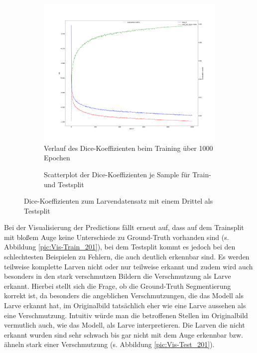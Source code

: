 \begin{figure}[H]
\centering
\begin{minipage}{.6\textwidth}
\begin{subfigure}{\textwidth}
\centering
\includegraphics[width=\textwidth]{Pictures/nnUnet/Praxis/Task201-Larven-drittel-testsplit/progress_201-Larven-drittel-testsplit.png}
\caption{Verlauf des Dice-Koeffizienten beim Training über 1000 Epochen}
\label{pic:Prog_201}
\end{subfigure}
\end{minipage}%
\begin{minipage}{.4\textwidth}
\begin{subfigure}{\textwidth}

\caption{Scatterplot der Dice-Koeffizienten je Sample für Train- und Testsplit}
\label{pic:Dice_201}
\end{subfigure}
\end{minipage}

\caption{Dice-Koeffizienten zum Larvendatensatz mit einem Drittel als Testsplit}
\end{figure}

Bei der Visualisierung der Predictions fällt erneut auf, dass auf dem Trainsplit mit bloßem Auge keine Unterschiede zu Ground-Truth vorhanden sind (s. Abbildung \ref{pic:Vis-Train_201}), bei dem Testsplit kommt es jedoch bei den schlechtesten Beispielen zu Fehlern, die auch deutlich erkennbar sind. Es werden teilweise komplette Larven nicht oder nur teilweise erkannt und zudem wird auch besonders in den stark verschmutzen Bildern die Verschmutzung als Larve erkannt. Hierbei stellt sich die Frage, ob die Ground-Truth Segmentierung korrekt ist, da besonders die angeblichen Verschmutzungen, die das Modell als Larve erkannt hat, im Originalbild tatsächlich eher wie eine Larve aussehen als eine Verschmutzung. Intuitiv würde man die betroffenen Stellen im Originalbild vermutlich auch, wie das Modell, als Larve interpretieren. Die Larven die nicht erkannt wurden sind sehr schwach bis gar nicht mit dem Auge erkennbar bzw. ähneln stark einer Verschmutzung (s. Abbildung \ref{pic:Vis-Test_201}).

